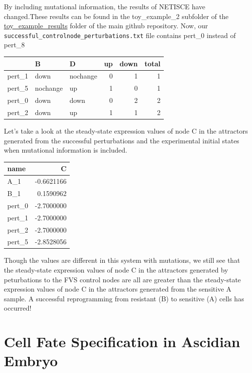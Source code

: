 \documentclass[
]{book}
\begin{document}
By including mutational information, the results of NETISCE have changed.These results can be found in the toy\_example\_2 subfolder of the \href{https://github.com/VeraLiconaResearchGroup/Netisce/tree/main/toy_example_results}{toy\_example\_results} folder of the main github repository.
Now, our \texttt{successful\_controlnode\_perturbations.txt} file contains pert\_0 instead of pert\_8

\begin{tabular}{l|l|l|r|r|r}
\hline
  & B & D & up & down & total\\
\hline
pert\_1 & down & nochange & 0 & 1 & 1\\
\hline
pert\_5 & nochange & up & 1 & 0 & 1\\
\hline
pert\_0 & down & down & 0 & 2 & 2\\
\hline
pert\_2 & down & up & 1 & 1 & 2\\
\hline
\end{tabular}

Let's take a look at the steady-state expression values of node C in the attractors generated from the successful perturbations and the experimental initial states when mutational information is included.

\begin{tabular}{l|r}
\hline
name & C\\
\hline
A\_1 & -0.6621166\\
\hline
B\_1 & 0.1590962\\
\hline
pert\_0 & -2.7000000\\
\hline
pert\_1 & -2.7000000\\
\hline
pert\_2 & -2.7000000\\
\hline
pert\_5 & -2.8528056\\
\hline
\end{tabular}

Though the values are different in this system with mutations, we still see that the steady-state expression values of node C in the attractors generated by peturbations to the FVS control nodes are all are greater than the steady-state expression values of node C in the attractors generated from the sensitive A sample. A successful reprogramming from resistant (B) to sensitive (A) cells has occurred!

\hypertarget{cell-fate-specification-in-ascidian-embryo}{%
\chapter{Cell Fate Specification in Ascidian Embryo}\label{cell-fate-specification-in-ascidian-embryo}}
\end{document}
